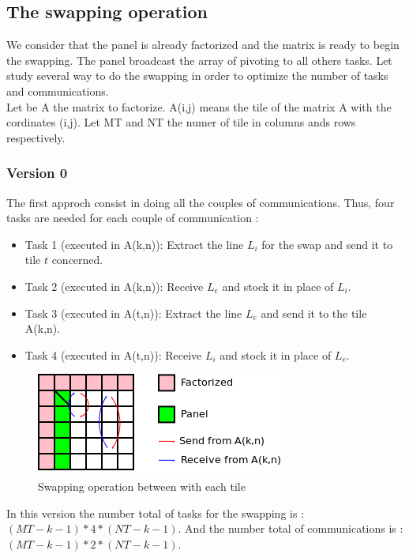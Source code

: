 \documentclass{report}
\begin{document}
\subsection{The swapping operation}
We consider that the panel is already factorized and the matrix is ready to begin the swapping. The panel broadcast the array of pivoting to all others tasks. Let study several way to do the swapping in order to optimize the number of tasks and communications.\\
Let be A the matrix to factorize. A(i,j) means the tile of the matrix A with the cordinates (i,j). Let MT and NT the numer of tile in columns ands rows respectively.

\subsubsection*{Version 0}
The first approch consist in doing all the couples of communications. Thus, four tasks are needed for each couple of communication :
\begin{itemize}
\item Task 1 (executed in A(k,n)): Extract the line $L_i$ for the swap and send it to tile $t$ concerned.
\item Task 2 (executed in A(k,n)): Receive $L_e$ and stock it in place of $L_i$.
\item Task 3 (executed in A(t,n)): Extract the line $L_e$ and send it to the tile A(k,n).
\item Task 4 (executed in A(t,n)): Receive $L_i$ and stock it in place of $L_e$.
\end{itemize}
\begin{figure}[!ht]
\begin{center}
\includegraphics[scale=1]{version0.png} 
\end{center}
\caption{Swapping operation between with each tile}
\end{figure}
In this version the number total of tasks for the swapping is : $(MT-k-1)*4*(NT-k-1)$.
And the number total of communications is : $(MT-k-1)*2*(NT-k-1)$.
\end{document}
